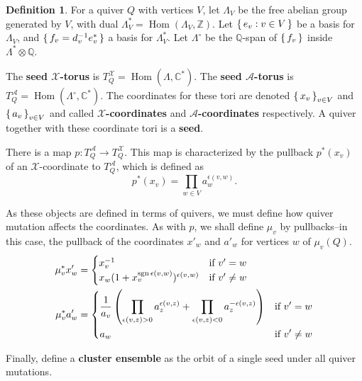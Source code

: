 \documentclass{amsart}
\theoremstyle{plain}
\theoremstyle{definition}
\newtheorem{definition}[theorem]{Definition}
\theoremstyle{remark}
\newcommand{\defined}[1]{\textbf{#1}}
\newcommand{\seedAtorus}{T^{\mathcal{A}}}
\newcommand{\seedXtorus}{T^{\mathcal{X}}}
\DeclareMathOperator{\Hom}{Hom}
\DeclareMathOperator{\sgn}{sgn}
\begin{document}
  \begin{definition}
    \label{def:cluster-ensemble}
    For a quiver $Q$ with vertices $V$, let $\Lambda_V$ be the free
    abelian group generated by $V$, with dual $\Lambda_V^{\ast} =
    \Hom(\Lambda_V, \mathbb{Z})$. Let $\set{e_v : v \in V}$ be a basis
    for $\Lambda_V$, and $\set{f_v = d_v^{-1} e_v^{\ast}}$ a basis for
    $\Lambda_V^{\ast}$. Let $\Lambda^{\circ}$ be the $\mathbb{Q}$-span
    of $\set{f_v}$ inside $\Lambda^{\ast} \otimes \mathbb{Q}$.

    The \defined{seed $\mathcal{X}$-torus} is $\seedXtorus_Q =
    \Hom(\Lambda, \mathbb{C}^{\ast})$. The \defined{seed
      $\mathcal{A}$-torus} is $\seedAtorus_Q = \Hom(\Lambda^{\circ},
    \mathbb{C}^{\ast})$. The coordinates for these tori are denoted
    $\set{x_v}_{v \in V}$ and $\set{a_v}_{v \in V}$ and called
    \defined{$\mathcal{X}$-coordinates} and
    \defined{$\mathcal{A}$-coordinates} respectively. A quiver together
    with these coordinate tori is a \defined{seed}.

    There is a map $p: \seedAtorus_Q \to \seedXtorus_Q$. This map is
    characterized by the pullback $p^{\ast}(x_v)$ of an
    $\mathcal{X}$-coordinate to $\seedAtorus_Q$, which is defined as \[
      p^{\ast}(x_v) = \prod_{w \in V} a_w^{\epsilon(v,w)}. \]

    As these objects are defined in terms of quivers, we must define how
    quiver mutation affects the coordinates. As with $p$, we shall
    define $\mu_v$ by pullbacks--in this case, the pullback of the
    coordinates $x'_w$ and $a'_w$ for vertices $w$ of $\mu_v(Q)$.
    \begin{align*}
      \mu_v^{\ast} x'_w &= \begin{cases}
        x_v^{-1} & \text{if $v' = w$} \\
        x_w(1 + x_v^{\sgn \epsilon(v,w)})^{\epsilon(v,w)} & \text{if $v' \ne w$} \\
      \end{cases} \\
      \mu_v^{\ast} a'_w &=
      \begin{dcases}
        \frac{1}{a_v} \left(
        \prod_{\epsilon(v,z) > 0} a_z^{\epsilon(v,z)} +
        \prod_{\epsilon(v,z) < 0} a_z^{-\epsilon(v,z)}
        \right) & \text{if $v' = w$} \\
        a_w & \text{if $v' \ne w$}
      \end{dcases}
    \end{align*}

    Finally, define a \defined{cluster ensemble} as the orbit of a
    single seed under all quiver mutations.
  \end{definition}
\end{document}
